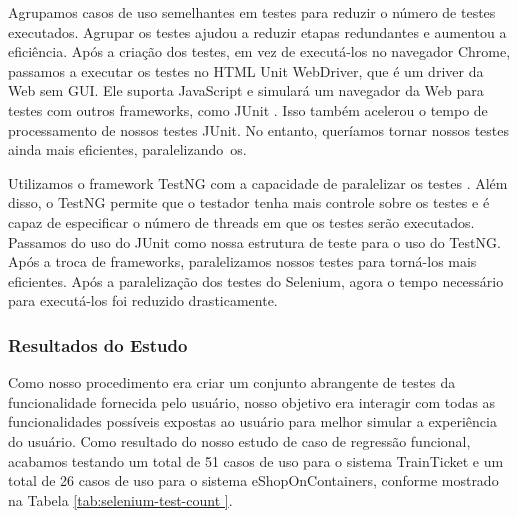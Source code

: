 Agrupamos casos de uso semelhantes em testes para reduzir o número de testes executados. Agrupar os testes ajudou a reduzir etapas redundantes e aumentou a eficiência. Após a criação dos testes, em vez de executá-los no navegador Chrome, passamos a executar os testes no HTML Unit WebDriver, que é um driver da Web sem GUI. Ele suporta JavaScript e simulará um navegador da Web para testes com outros frameworks, como JUnit \cite{html_unit}. Isso também acelerou o tempo de processamento de nossos testes JUnit. No entanto, queríamos tornar nossos testes ainda mais eficientes, paralelizando~os.

Utilizamos o framework TestNG com a capacidade de paralelizar os testes \cite{testng}. Além disso, o TestNG permite que o testador tenha mais controle sobre os testes e é capaz de especificar o número de threads em que os testes serão executados. Passamos do uso do JUnit como nossa estrutura de teste para o uso do TestNG. Após a troca de frameworks, paralelizamos nossos testes para torná-los mais eficientes. Após a paralelização dos testes do Selenium, agora o tempo necessário para executá-los foi reduzido drasticamente.

\subsubsection{Resultados do Estudo}

Como nosso procedimento era criar um conjunto abrangente de testes da funcionalidade fornecida pelo usuário, nosso objetivo era interagir com todas as funcionalidades possíveis expostas ao usuário para melhor simular a experiência do usuário. Como resultado do nosso estudo de caso de regressão funcional, acabamos testando um total de 51 casos de uso para o sistema TrainTicket e um total de 26 casos de uso para o sistema eShopOnContainers, conforme mostrado na Tabela \ref{tab:selenium-test-count }.

